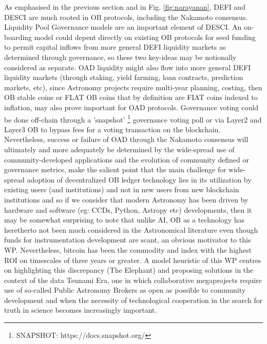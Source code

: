 \documentclass[final,5p,times,twocolumn,authoryear]{elsarticle}
\begin{document}
As emphasised in the previous section and in Fig. \ref{fig:narayanan}, DEFI and DESCI are much rooted in OB protocols, including the Nakamoto consensus. Liquidity Pool Governance models are an important element of DESCI. An on-boarding model could depent directly on existing OB protocols for seed funding to permit capital inflows from more general DEFI liquidity markets as determined through governance, so these two key-ideas may be notionally considered as separate. OAD liquidity might also flow into more general DEFI liquidity markets (through staking, yield farming, loan contracts, prediction markets, etc), since Astronomy projects require multi-year planning, costing, then OB stable coins or FLAT OB coins that by definition are FIAT coins indexed to inflation, may also prove important for OAD protocols. Governance voting could be done off-chain through a 'snapshot' \footnote{SNAPSHOT: https://docs.snapshot.org/} governance voting poll or via Layer2 and Layer3 OB to bypass fees for a voting transaction on the blockchain. Nevertheless, success or failure of OAD through the Nakamoto consensus will ultimately and more adequately be determined by the wide-spread use of community-developed applications and the evolution of community defined or governance metrics. \cite{arvindandclark2017} make the salient point that the main challenge for wide-spread adoption of decentralized OB ledger technology lies in its utilization by existing users (and institutions) and not in new users from new blockchain institutions and so if we consider that modern Astronomy has been driven by hardware and software (eg: CCDs, Python, Astropy etc) developments, then it may be somewhat surprising to note that unlike AI, OB as a technology has heretherto not been much considered in the Astronomical literature even though funds for instrumentation development are scant, an obvious motivator to this WP. Nevertheless, bitcoin has been the commodity and index with the highest ROI on timescales of three years or greater. A model heuristic of this WP centres on highlighting this discrepancy (The Elephant) and proposing solutions in the context of the data Tsunami Era, one in which collaborative megaprojects require use of so-called Public Astronomy Brokers as open as possible to community development and when the necessity of technological cooperation in the search for truth in science becomes increasingly important.  
\end{document}
